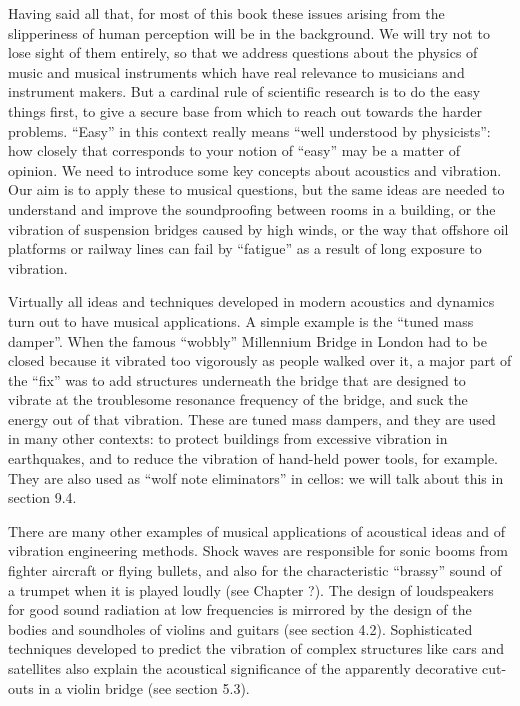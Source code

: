   Having said all that, for most of this book these issues arising from the 
  slipperiness of human perception will be in the background. We will try not 
  to lose sight of them entirely, so that we address questions about the 
  physics of music and musical instruments which have real relevance to 
  musicians and instrument makers. But a cardinal rule of scientific research 
  is to do the easy things first, to give a secure base from which to reach out 
  towards the harder problems. ``Easy'' in this context really means ``well 
  understood by physicists'': how closely that corresponds to your notion of 
  ``easy'' may be a matter of opinion. We need to introduce some key concepts 
  about acoustics and vibration. Our aim is to apply these to musical 
  questions, but the same ideas are needed to understand and improve the 
  soundproofing between rooms in a building, or the vibration of suspension 
  bridges caused by high winds, or the way that offshore oil platforms or 
  railway lines can fail by ``fatigue'' as a result of long exposure to 
  vibration. 

  Virtually all ideas and techniques developed in modern acoustics and dynamics 
  turn out to have musical applications. A simple example is the ``tuned mass 
  damper''. When the famous ``wobbly'' Millennium Bridge in London had to be 
  closed because it vibrated too vigorously as people walked over it, a major 
  part of the ``fix'' was to add structures underneath the bridge that are 
  designed to vibrate at the troublesome resonance frequency of the bridge, and 
  suck the energy out of that vibration. These are tuned mass dampers, and they 
  are used in many other contexts: to protect buildings from excessive 
  vibration in earthquakes, and to reduce the vibration of hand-held power 
  tools, for example. They are also used as ``wolf note eliminators'' in 
  cellos: we will talk about this in section 9.4. 

  There are many other examples of musical applications of acoustical ideas and 
  of vibration engineering methods. Shock waves are responsible for sonic booms 
  from fighter aircraft or flying bullets, and also for the characteristic 
  ``brassy'' sound of a trumpet when it is played loudly (see Chapter ?). The 
  design of loudspeakers for good sound radiation at low frequencies is 
  mirrored by the design of the bodies and soundholes of violins and guitars 
  (see section 4.2). Sophisticated techniques developed to predict the 
  vibration of complex structures like cars and satellites also explain the 
  acoustical significance of the apparently decorative cut-outs in a violin 
  bridge (see section 5.3). 

